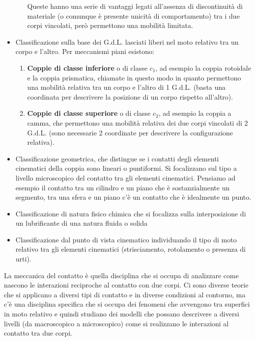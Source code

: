\begin{itemize}
\begin{enumerate}
Queste hanno una serie di vantaggi legati all'assenza di discontinuità di materiale (o comunque è presente unicità di comportamento) tra i due corpi vincolati, però permettono una mobilità limitata.
\end{enumerate}
\item Classificazione sulla base dei G.d.L. lasciati liberi nel moto relativo tra un corpo e l'altro. Per meccanismi piani esistono:
\begin{enumerate}
\item \textbf{Coppie di classe inferiore} o di classe $c_1$, ad esempio la coppia rotoidale e la coppia prismatica, chiamate in questo modo in quanto permettono una mobilità relativa tra un corpo e l'altro di 1 G.d.L. (basta una coordinata per descrivere la posizione di un corpo rispetto all'altro).
\item \textbf{Coppie di classe superiore} o di classe $c_2$, ad esempio la coppia a camma, che permettono una mobilità relativa dei due corpi vincolati di 2 G.d.L. (sono necessarie 2 coordinate per descrivere la configurazione relativa).
\end{enumerate}
\item Classificazione geometrica, che distingue se i contatti degli elementi cinematici della coppia sono lineari o puntiformi. Si focalizzano sul tipo a livello microscopico del contatto tra gli elementi cinematici. Pensiamo ad esempio il contatto tra un cilindro e un piano che è sostanzialmente un segmento, tra una sfera e un piano c'è un contatto che è idealmente un punto.
\item Classificazione di natura fisico chimica che si focalizza sulla interposizione di un lubrificante di una natura fluida o solida
\item Classificazione dal punto di vista cinematico individuando il tipo di moto relativo tra gli elementi cinematici (strisciamento, rotolamento o presenza di urti).
\end{itemize}

La meccanica del contatto è quella disciplina che si occupa di analizzare come nascono le interazioni reciproche al contatto con due corpi. Ci sono diverse teorie che si applicano a diversi tipi di contatto e in diverse condizioni al contorno, ma c'è una disciplina specifica che si occupa dei fenomeni che avvengono tra superfici in moto relativo e quindi studiano dei modelli che possano descrivere a diversi livelli (da macroscopico a microscopico) come si realizzano le interazioni al contatto tra due corpi.

